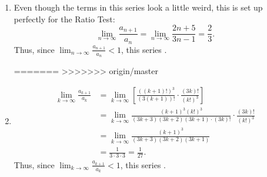 \documentclass[handout]{ximera}
\begin{document}
\begin{problem}
\begin{freeResponse}
\begin{enumerate}
		
	
		\item  {}
		
		Even though the terms in this series look a little weird, this is set up perfectly for the Ratio Test:
			\[
			\lim_{n \to \infty} \frac{a_{n+1}}{a_n} = \lim_{n \to \infty} \frac{2n+5}{3n-1} = \frac{2}{3}.
			\]
		Thus, since $\lim_{n \to \infty} \frac{a_{n+1}}{a_n} < 1$, this series .  
		
		
	
%		
%		
%		
%	
%		
=======
>>>>>>> origin/master
	

		\item {}
		\begin{align*}
			\lim_{k \to \infty} \frac{a_{k+1}}{a_k} 
			&= \lim_{k \to \infty} \left[ \frac{( (k+1)!)^3}{(3(k+1))!}  \cdot \frac{(3k)!}{(k!)^3} \right]  \\
			&= \lim_{k \to \infty} \frac{ (k+1)^3 (k!)^3}{(3k+3)(3k+2)(3k+1) \cdot (3k)!} \cdot \frac{(3k)!}{(k!)^3} \\
			&= \lim_{k \to \infty} \frac{(k+1)^3}{(3k+3)(3k+2)(3k+1)}  \\
			&= \frac{1}{3 \cdot 3 \cdot 3}= \frac{1}{27}.
			\end{align*}
		Thus, since $\lim_{k \to \infty} \frac{a_{k+1}}{a_k} < 1$, this series . 
		

\end{enumerate}
\end{freeResponse}
\end{problem}
\end{document}
